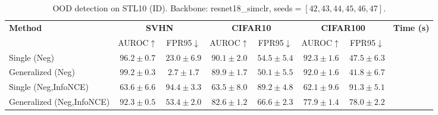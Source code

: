 \begin{table}[h!]
\centering
\caption{OOD detection on STL10 (ID). Backbone: resnet18_simclr, seeds$=[42, 43, 44, 45, 46, 47]$.}
\footnotesize
\begin{tabular}{lccccccc}
\toprule
\textbf{Method} & \multicolumn{2}{c}{\textbf{SVHN}} & \multicolumn{2}{c}{\textbf{CIFAR10}} & \multicolumn{2}{c}{\textbf{CIFAR100}} & \textbf{Time (s)} \\
\cmidrule(lr){2-3}
\cmidrule(lr){4-5}
\cmidrule(lr){6-7}
 & AUROC$\uparrow$ & FPR95$\downarrow$ & AUROC$\uparrow$ & FPR95$\downarrow$ & AUROC$\uparrow$ & FPR95$\downarrow$ & \\
\midrule
Single (Neg) 
& $96.2 \pm 0.7$ 
& $23.0 \pm 6.9$ 
& $90.1 \pm 2.0$ 
& $54.5 \pm 5.4$ 
& $92.3 \pm 1.6$ 
& $47.5 \pm 6.3$ \\
Generalized (Neg) 
& $99.2 \pm 0.3$ 
& $2.7 \pm 1.7$ 
& $89.9 \pm 1.7$ 
& $50.1 \pm 5.5$ 
& $92.0 \pm 1.6$ 
& $41.8 \pm 6.7$ \\
Single (Neg,InfoNCE) 
& $63.6 \pm 6.6$ 
& $94.4 \pm 3.3$ 
& $63.5 \pm 8.0$ 
& $89.2 \pm 4.8$ 
& $62.1 \pm 9.6$ 
& $91.3 \pm 5.1$ \\
Generalized (Neg,InfoNCE) 
& $92.3 \pm 0.5$ 
& $53.4 \pm 2.0$ 
& $82.6 \pm 1.2$ 
& $66.6 \pm 2.3$ 
& $77.9 \pm 1.4$ 
& $78.0 \pm 2.2$ \\
\bottomrule
\end{tabular}
\end{table}